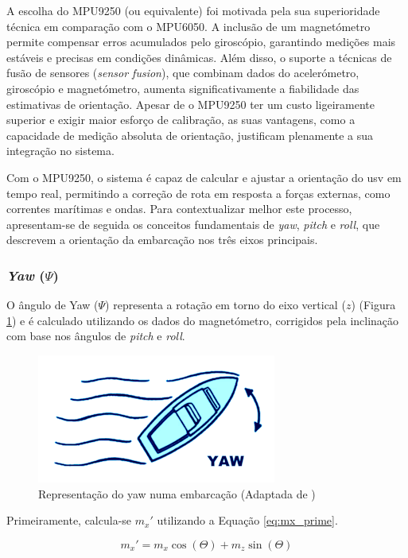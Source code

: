 A escolha do MPU9250 (ou equivalente) foi motivada pela sua superioridade técnica em comparação com o MPU6050. A inclusão de um magnetómetro permite compensar erros acumulados pelo giroscópio, garantindo medições mais estáveis e precisas em condições dinâmicas. Além disso, o suporte a técnicas de fusão de sensores (\emph{sensor fusion}), que combinam dados do acelerómetro, giroscópio e magnetómetro, aumenta significativamente a fiabilidade das estimativas de orientação. Apesar de o MPU9250 ter um custo ligeiramente superior e exigir maior esforço de calibração, as suas vantagens, como a capacidade de medição absoluta de orientação, justificam plenamente a sua integração no sistema.

Com o MPU9250, o sistema é capaz de calcular e ajustar a orientação do \gls{usv} em tempo real, permitindo a correção de rota em resposta a forças externas, como correntes marítimas e ondas. Para contextualizar melhor este processo, apresentam-se de seguida os conceitos fundamentais de \emph{yaw}, \emph{pitch} e \emph{roll}, que descrevem a orientação da embarcação nos três eixos principais.

\subsubsection{\emph{Yaw} (\(\Psi\))}
O ângulo de Yaw (\(\Psi\)) representa a rotação em torno do eixo vertical (\(z\)) (Figura \ref{fig:yaw}) e é calculado utilizando os dados do magnetómetro, corrigidos pela inclinação com base nos ângulos de \emph{pitch} e \emph{roll}. 

\begin{figure}[H]
    \centering
    \includegraphics[height=0.2\linewidth]{figuras/Yaw.png}
    \caption[Representação do yaw numa embarcação]{Representação do yaw numa embarcação (Adaptada de \cite{imagem-yaw-pitch-roll})}
    \label{fig:yaw}
\end{figure}

Primeiramente, calcula-se \(m_x'\) utilizando a Equação \ref{eq:mx_prime}.

\begin{equation}
    m_x' = m_x \cos(\Theta) + m_z \sin(\Theta)
    \label{eq:mx_prime}
\end{equation}

